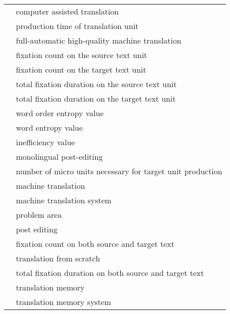 
\noindent\begin{tabularx}{\textwidth}{@{}lQ@{}} 
 & computer assisted translation\\
 & production time of translation unit\\
 & full-automatic high-quality machine translation\\
 & fixation count on the source text unit\\
 & fixation count on the target text unit\\
 & total fixation duration on the source text unit\\
 & total fixation duration on the target text unit\\
 & word order entropy value\\
 & word entropy value\\
 & inefficiency value\\
 & monolingual post-editing\\
 & number of micro units necessary for target unit production\\
 & machine translation\\
 & machine translation system\\
 & problem area\\
 & post editing\\
 & fixation count on both source and target text\\
 & translation from scratch\\
 & total fixation duration on both source and target text\\
 & translation memory\\
 & translation memory system\\ 
\end{tabularx}
